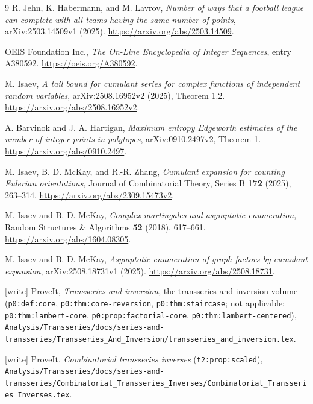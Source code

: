 \documentclass[11pt,a4paper]{article}
\numberwithin{equation}{section}
\theoremstyle{remark}
\newcommand{\1}{\mathbf 1}
\begin{document}
\begingroup\raggedright
\begin{thebibliography}{9}
R. Jehn, K. Habermann, and M. Lavrov,
\emph{Number of ways that a football league can complete with all teams
having the same number of points}, arXiv:2503.14509v1 (2025).
\url{https://arxiv.org/abs/2503.14509}.

OEIS Foundation Inc., \emph{The On-Line Encyclopedia of Integer Sequences},
entry A380592. \url{https://oeis.org/A380592}.

M. Isaev, \emph{A tail bound for cumulant series for complex functions of
independent random variables}, arXiv:2508.16952v2 (2025), Theorem 1.2.
\url{https://arxiv.org/abs/2508.16952v2}.

A. Barvinok and J. A. Hartigan, \emph{Maximum entropy Edgeworth estimates
of the number of integer points in polytopes}, arXiv:0910.2497v2,
Theorem 1. \url{https://arxiv.org/abs/0910.2497}.

M. Isaev, B. D. McKay, and R.-R. Zhang,
\emph{Cumulant expansion for counting Eulerian orientations},
Journal of Combinatorial Theory, Series B \textbf{172} (2025), 263--314.
\url{https://arxiv.org/abs/2309.15473v2}.

M. Isaev and B. D. McKay, \emph{Complex martingales and asymptotic enumeration},
Random Structures \& Algorithms \textbf{52} (2018), 617--661.
\url{https://arxiv.org/abs/1604.08305}.

M. Isaev and B. D. McKay,
\emph{Asymptotic enumeration of graph factors by cumulant expansion},
arXiv:2508.18731v1 (2025).
\url{https://arxiv.org/abs/2508.18731}.

 [write] ProveIt, \emph{Transseries and inversion}, the
transseries-and-inversion volume (\texttt{p0:def:core},
\texttt{p0:thm:core-reversion}, \texttt{p0:thm:staircase}; not
applicable: \texttt{p0:thm:lambert-core}, \texttt{p0:prop:factorial-core},
\texttt{p0:thm:lambert-centered}),
\nolinkurl{Analysis/Transseries/docs/series-and-transseries/Transseries_And_Inversion/transseries_and_inversion.tex}.

 [write] ProveIt, \emph{Combinatorial transseries
inverses} (\texttt{t2:prop:scaled}),
\nolinkurl{Analysis/Transseries/docs/series-and-transseries/Combinatorial_Transseries_Inverses/Combinatorial_Transseries_Inverses.tex}.
\end{thebibliography}
\endgroup
\end{document}
